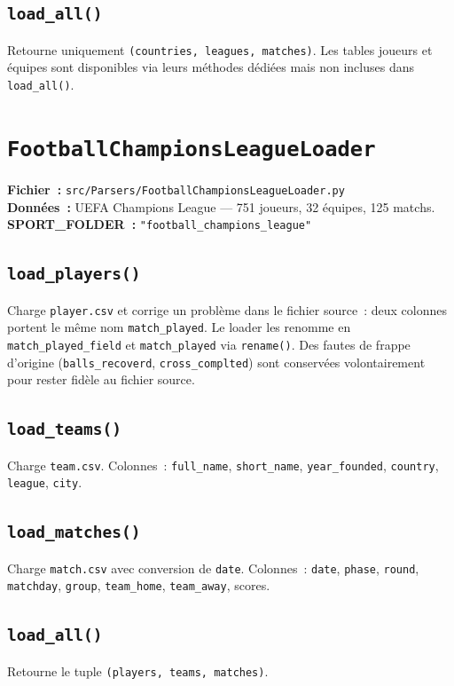 \documentclass[12pt,a4paper]{article}
\begin{document}
\subsection{\texttt{load\_all()}}
Retourne uniquement \texttt{(countries, leagues, matches)}. Les tables joueurs
et équipes sont disponibles via leurs méthodes dédiées mais non incluses dans
\texttt{load\_all()}.

\section{\texttt{FootballChampionsLeagueLoader}}

\textbf{Fichier~:} \texttt{src/Parsers/FootballChampionsLeagueLoader.py}\\
\textbf{Données~:} UEFA Champions League — 751 joueurs, 32 équipes,
125 matchs.\\
\textbf{SPORT\_FOLDER~:} \texttt{"football\_champions\_league"}

\subsection{\texttt{load\_players()}}
Charge \texttt{player.csv} et corrige un problème dans le fichier source~:
deux colonnes portent le même nom \texttt{match\_played}. Le loader les renomme
en \texttt{match\_played\_field} et \texttt{match\_played} via
\texttt{rename()}. Des fautes de frappe d'origine
(\texttt{balls\_recoverd}, \texttt{cross\_complted}) sont conservées
volontairement pour rester fidèle au fichier source.

\subsection{\texttt{load\_teams()}}
Charge \texttt{team.csv}. Colonnes~: \texttt{full\_name}, \texttt{short\_name},
\texttt{year\_founded}, \texttt{country}, \texttt{league}, \texttt{city}.

\subsection{\texttt{load\_matches()}}
Charge \texttt{match.csv} avec conversion de \texttt{date}. Colonnes~:
\texttt{date}, \texttt{phase}, \texttt{round}, \texttt{matchday},
\texttt{group}, \texttt{team\_home}, \texttt{team\_away}, scores.

\subsection{\texttt{load\_all()}}
Retourne le tuple \texttt{(players, teams, matches)}.
\end{document}
